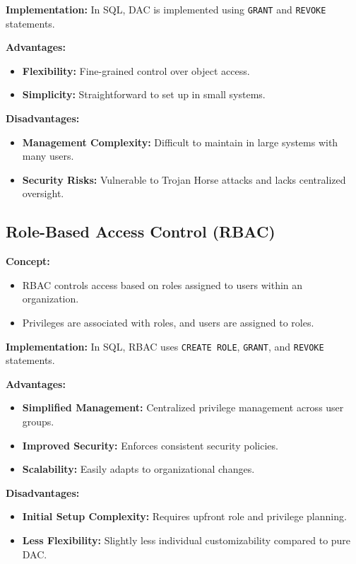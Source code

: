 \documentclass[12pt,a4paper]{article}
\begin{document}
\textbf{Implementation:}
In SQL, DAC is implemented using \texttt{GRANT} and \texttt{REVOKE} statements.

\textbf{Advantages:}
\begin{itemize}
    \item \textbf{Flexibility:} Fine-grained control over object access.
    \item \textbf{Simplicity:} Straightforward to set up in small systems.
\end{itemize}

\textbf{Disadvantages:}
\begin{itemize}
    \item \textbf{Management Complexity:} Difficult to maintain in large systems with many users.
    \item \textbf{Security Risks:} Vulnerable to Trojan Horse attacks and lacks centralized oversight.
\end{itemize}

\subsection{Role-Based Access Control (RBAC)}

\textbf{Concept:}
\begin{itemize}
    \item RBAC controls access based on roles assigned to users within an organization.
    \item Privileges are associated with roles, and users are assigned to roles.
\end{itemize}

\textbf{Implementation:}
In SQL, RBAC uses \texttt{CREATE ROLE}, \texttt{GRANT}, and \texttt{REVOKE} statements.

\textbf{Advantages:}
\begin{itemize}
    \item \textbf{Simplified Management:} Centralized privilege management across user groups.
    \item \textbf{Improved Security:} Enforces consistent security policies.
    \item \textbf{Scalability:} Easily adapts to organizational changes.
\end{itemize}

\textbf{Disadvantages:}
\begin{itemize}
    \item \textbf{Initial Setup Complexity:} Requires upfront role and privilege planning.
    \item \textbf{Less Flexibility:} Slightly less individual customizability compared to pure DAC.
\end{itemize}
\end{document}
